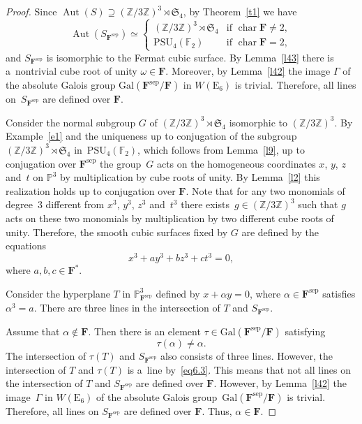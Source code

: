 \documentclass{amsart}
\numberwithin{equation}{section}
\theoremstyle{plain}
\theoremstyle{definition}
\theoremstyle{remark}
\begin{document}
\begin{proof}
Since $\operatorname{Aut}(S) \supseteq (\mathbb{Z}/3\mathbb{Z})^3 \rtimes \mathfrak{S}_4$, by Theorem~\ref{t1} we have
$$
\operatorname{Aut}(S_{\mathbf{F}^{\mathrm{sep}}}) \simeq
\begin{cases}
 (\mathbb{Z}/3\mathbb{Z})^3 \rtimes \mathfrak{S}_4 &\text{if } \operatorname{char}\mathbf{F} \neq 2,
 \\
\mathrm{PSU}_4(\mathbb{F}_2) &\text{if }\operatorname{char}\mathbf{F} = 2,
\end{cases}
$$
and $S_{\mathbf{F}^{\mathrm{sep}}}$ is isomorphic to the Fermat cubic surface. By Lemma~\ref{l43} there is a~nontrivial cube root of unity $\omega \in \mathbf{F}$. Moreover, by Lemma~\ref{l42} the image $\Gamma$ of the absolute Galois group $\mathrm{Gal}(\mathbf{F}^{\mathrm{sep}}/\mathbf{F})$ in $W(\mathrm{E}_6)$ is trivial. Therefore, all lines on~$S_{\mathbf{F}^{\mathrm{sep}}}$ are defined over $\mathbf{F}$.

Consider the normal subgroup $G$ of $(\mathbb{Z}/3\mathbb{Z})^3 \rtimes \mathfrak{S}_4$ isomorphic to $(\mathbb{Z}/3\mathbb{Z})^3$. By Example~\ref{e1} and the uniqueness up to conjugation of the subgroup $(\mathbb{Z}/3\mathbb{Z})^3 \rtimes \mathfrak{S}_4$ in~$\mathrm{PSU}_4(\mathbb{F}_2)$, which follows from Lemma~\ref{l9}, up to conjugation over $\mathbf{F}^{\mathrm{sep}}$ the group~$G$ acts on the homogeneous coordinates $x$, $y$, $z$ and~$t$ on $\mathbb{P}^3$ by multiplication by cube roots of unity. By Lemma~\ref{l2} this realization holds up to conjugation over $\mathbf{F}$. Note that for any two monomials of degree~$3$ different from $x^3$, $y^3$, $z^3$ and~$t^3$ there exists~\mbox{$g \in (\mathbb{Z}/3\mathbb{Z})^3$} such that $g$ acts on these two monomials by multiplication by two different cube roots of unity. Therefore, the smooth cubic surfaces fixed by $G$ are defined by the equations
\begin{equation}
\label{eq6.2}
x^3+ay^3+bz^3+ct^3=0,
\end{equation}
where $a,b,c \in \mathbf{F}^*$.

Consider the hyperplane $T$ in $\mathbb{P}^3_{\mathbf{F}^{\mathrm{sep}}}$ defined by $x+\alpha y=0$, where $\alpha \in \mathbf{F}^{\mathrm{sep}}$ satisfies $\alpha^3=a$. There are three lines in the intersection of $T$ and $S_{\mathbf{F}^{\mathrm{sep}}}$.

Assume that $\alpha \notin \mathbf{F}$. Then there is an element $\tau \in \mathrm{Gal}(\mathbf{F}^{\mathrm{sep}}/\mathbf{F})$ satisfying
\begin{equation}
\label{eq6.3}
\tau(\alpha) \neq \alpha.
\end{equation}
The intersection of $\tau(T)$ and $S_{\mathbf{F}^{\mathrm{sep}}}$ also consists of three lines. However, the intersection of $T$ and $\tau(T)$ is a~line by~\eqref{eq6.3}. This means that not all lines on the intersection of $T$ and $S_{\mathbf{F}^{\mathrm{sep}}}$ are defined over $\mathbf{F}$. However, by Lemma~\ref{l42} the image~$\Gamma$ in $W(\mathrm{E}_6)$ of the absolute Galois group~$\mathrm{Gal}(\mathbf{F}^{\mathrm{sep}}/\mathbf{F})$ is trivial. Therefore, all lines on $S_{\mathbf{F}^{\mathrm{sep}}}$ are defined over $\mathbf{F}$. Thus, $\alpha \in \mathbf{F}$.


\end{proof}
\end{document}
